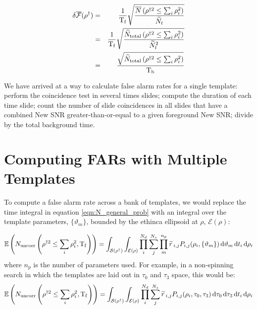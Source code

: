 \begin{eqnarray}
\label{eqn:err_FAR}
\delta \overline{\far}(\rho^\dagger) & = & \frac{1}{\Tf} \sqrt{\frac{\overline{N} \left(\rho^{\dagger2} \leq \sum_{i} \rho_i^2 \right)}{\widetilde{N}_t}} \nonumber \\
 & = & \frac{1}{\Tf} \sqrt{\frac{\widehat{N}_{\mathrm{total}} \left(\rho^{\dagger2} \leq \sum_{i} \rho_i^2 \right)}{\widetilde{N}_t^2}} \nonumber \\
 & = & \frac{\sqrt{\widehat{N}_{\mathrm{total}} \left(\rho^{\dagger2} \leq \sum_{i} \rho_i^2 \right)}}{\Tb}
\end{eqnarray}

We have arrived at a way to calculate false alarm rates for a single template: perform the coincidence test in several times slides; compute the duration of each time slide; count the number of slide coincidences in all slides that have a combined New \ac{SNR} greater-than-or-equal to a given foreground New \ac{SNR}; divide by the total background time.

\section{Computing FARs with Multiple Templates}
\label{sec:mulitple_templates}

To compute a false alarm rate across a bank of templates, we would replace the time integral in equation \ref{eqn:N_general_prob} with an integral over the template parameters, $\{\vartheta_m\}$, bounded by the ethinca ellipsoid at $\rho$, $\mathcal{E}(\rho)$:

\begin{equation}
\mathbb{E}\left(N_{\mathrm{uncorr}}\left(\rho^{\dagger2} \leq \sum_i\rho_i^2, \mathrm{T_f} \right)\right) = \int_{\mathcal{S}(\rho^\dagger)} \int_{\mathcal{E(\rho)}} \prod_i^{N_d} \sum_j^{N_s}  \prod_{m}^{n_p} \widetilde{r}\,_{i,j} P_{i,j}(\rho_i, \{\vartheta_m \}) \,\mathrm{d} \vartheta_m \,\mathrm{d} t_i \,\mathrm{d} \rho_i
\end{equation}
where $n_p$ is the number of parameters used. For example, in a non-spinning search in which the templates are laid out in $\tau_0$ and $\tau_3$ space, this would be:
\begin{equation}
\mathbb{E}\left(N_{\mathrm{uncorr}}\left(\rho^{\dagger2} \leq \sum_i\rho_i^2, \mathrm{T_f} \right)\right) = \int_{\mathcal{S}(\rho^\dagger)} \int_{\mathcal{E(\rho)}} \prod_i^{N_d} \sum_j^{N_s}  \widetilde{r}\,_{i,j} P_{i,j}(\rho_i, \tau_0, \tau_3) \,\mathrm{d} \tau_0 \,\mathrm{d} \tau_3 \,\mathrm{d} t_i \,\mathrm{d} \rho_i
\end{equation}

